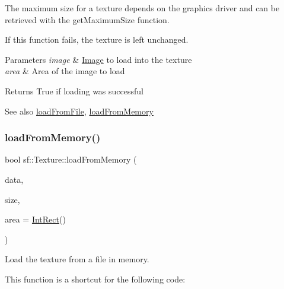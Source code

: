 The maximum size for a texture depends on the graphics driver and can be retrieved with the get\+Maximum\+Size function.

If this function fails, the texture is left unchanged.


\begin{DoxyParams}{Parameters}
{\em image} & \mbox{\hyperlink{classsf_1_1_image}{Image}} to load into the texture \\
\hline
{\em area} & Area of the image to load\\
\hline
\end{DoxyParams}
\begin{DoxyReturn}{Returns}
True if loading was successful
\end{DoxyReturn}
\begin{DoxySeeAlso}{See also}
\mbox{\hyperlink{classsf_1_1_texture_a8e1b56eabfe33e2e0e1cb03712c7fcc7}{load\+From\+File}}, \mbox{\hyperlink{classsf_1_1_texture_a2c4adb19dd4cbee0a588eeb85e52a249}{load\+From\+Memory}} \begin{DoxyVerb}\end{DoxyVerb}
 
\end{DoxySeeAlso}
\mbox{\label{classsf_1_1_texture_a2c4adb19dd4cbee0a588eeb85e52a249}} 
\subsubsection{\texorpdfstring{loadFromMemory()}{loadFromMemory()}}
{\footnotesize\ttfamily bool sf\+::\+Texture\+::load\+From\+Memory (\begin{DoxyParamCaption}\item[{const void $\ast$}]{data,  }\item[{std\+::size\+\_\+t}]{size,  }\item[{const \mbox{\hyperlink{classsf_1_1_rect}{Int\+Rect}} \&}]{area = {\ttfamily \mbox{\hyperlink{classsf_1_1_rect}{Int\+Rect}}()} }\end{DoxyParamCaption})}



Load the texture from a file in memory. 

This function is a shortcut for the following code\+: 
\begin{DoxyCode}{0}
\end{DoxyCode}


